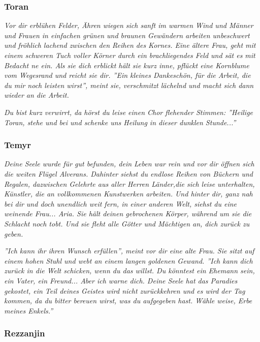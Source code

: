\subsubsection{Toran}

\emph{Vor dir erblühen Felder, Ähren wiegen sich sanft im warmen Wind und Männer und Frauen in einfachen grünen und braunen Gewändern arbeiten unbeschwert und fröhlich lachend zwischen den Reihen des Kornes. Eine ältere Frau, geht mit einem schweren Tuch voller Körner durch ein brachliegendes Feld und sät es mit Bedacht ne ein. Als sie dich erblickt hält sie kurz inne, pflückt eine Kornblume vom Wegesrand und reicht sie dir. ''Ein kleines Dankeschön, für die Arbeit, die du mir noch leisten wirst'', meint sie, verschmitzt lächelnd und macht sich dann wieder an die Arbeit.}

\emph{Du bist kurz verwirrt, da hörst du leise einen Chor flehender Stimmen: ''Heilige Toran, stehe und bei und schenke uns Heilung in dieser dunklen Stunde...''}

\subsubsection{Temyr}

\emph{Deine Seele wurde für gut befunden, dein Leben war rein und vor dir öffnen sich die weiten Flügel Alverans. Dahinter siehst du endlose Reihen von Büchern und Regalen, dazwischen Gelehrte aus aller Herren Länder,die sich leise unterhalten, Künstler, die an vollkommenen Kunstwerken arbeiten. Und hinter dir, ganz nah bei dir und doch unendlich weit fern, in einer anderen Welt, siehst du eine weinende Frau... Aria. Sie hält deinen gebrochenen Körper, während um sie die Schlacht noch tobt. Und sie fleht alle Götter und Mächtigen an, dich zurück zu geben.}

\emph{''Ich kann ihr ihren Wunsch erfüllen'', meint vor dir eine alte Frau. Sie sitzt auf einem hohen Stuhl und webt an einem langen goldenen Gewand. ''Ich kann dich zurück in die Welt schicken, wenn du das willst. Du könntest ein Ehemann sein, ein Vater, ein Freund... Aber ich warne dich. Deine Seele hat das Paradies gekostet, ein Teil deines Geistes wird nicht zurückkehren und es wird der Tag kommen, da du bitter bereuen wirst, was du aufgegeben hast. Wähle weise, Erbe meines Enkels.''}

\subsubsection{Rezzanjin}

